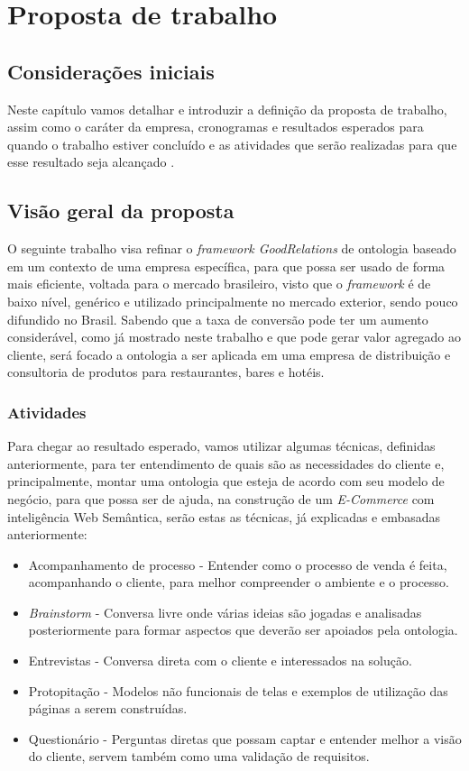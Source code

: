 \chapter{Proposta de trabalho}

\section{Considerações iniciais}
	Neste capítulo vamos detalhar e introduzir a definição da proposta de trabalho, assim como o caráter da empresa, cronogramas e resultados esperados para quando o trabalho estiver concluído e as atividades que serão realizadas para que esse resultado seja alcançado
.
\section{Visão geral da proposta}
	O seguinte trabalho visa refinar o \textit{framework GoodRelations} de ontologia baseado em um contexto de uma empresa específica, para que possa ser usado de forma mais eficiente, voltada para o mercado brasileiro, visto que o \textit{framework} é de baixo nível, genérico e utilizado principalmente no mercado exterior, sendo pouco difundido no Brasil. Sabendo que a taxa de conversão pode ter um aumento considerável, como já mostrado neste trabalho e que pode gerar valor agregado ao cliente, será focado a ontologia a ser aplicada em uma empresa de distribuição e consultoria de produtos para restaurantes, bares e hotéis. 

\subsection{Atividades}
	Para chegar ao resultado esperado, vamos utilizar algumas técnicas, definidas anteriormente, para ter entendimento de quais são as necessidades do cliente e, principalmente, montar uma ontologia que esteja de acordo com seu modelo de negócio, para que possa ser de ajuda, na construção de um \textit{E-Commerce} com inteligência Web Semântica, serão estas as técnicas, já explicadas e embasadas anteriormente:

\begin{itemize}
	\item Acompanhamento de processo - Entender como o processo de venda é feita, acompanhando o cliente, para melhor compreender o ambiente e o processo.
	\item \textit{Brainstorm} - Conversa livre onde várias ideias são jogadas e analisadas posteriormente para formar aspectos que deverão ser apoiados pela ontologia.
	\item Entrevistas - Conversa direta com o cliente e interessados na solução.
	\item Protopitação - Modelos não funcionais de telas e exemplos de utilização das páginas a serem construídas.
	\item Questionário - Perguntas diretas que possam captar e entender melhor a visão do cliente, servem também como uma validação de requisitos.
\end{itemize}


